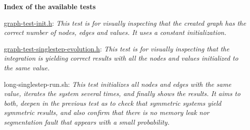 {\bfseries Index of the available tests}


\begin{DoxyItemize}
\item {\ttfamily \hyperlink{graph-test-init_8h_source}{graph-\/test-\/init.\+h}}\+: {\itshape  This test is for visually inspecting that the created graph has the correct number of nodes, edges and values. It uses a constant initialization.}
\item {\ttfamily \hyperlink{graph-test-singlestep-evolution_8h_source}{graph-\/test-\/singlestep-\/evolution.\+h}}\+: {\itshape This test is for visually inspecting that the integration is yielding correct results with all the nodes and values initialized to the same value.}
\item {\ttfamily long-\/singlestep-\/run.\+sh}\+: {\itshape This test initializes all nodes and edges with the same value, iterates the system several times, and finally shows the results. It aims to both, deepen in the previous test as to check that symmetric systems yield symmetric results, and also confirm that there is no memory leak nor segmentation fault that appears with a small probability.} 
\end{DoxyItemize}
